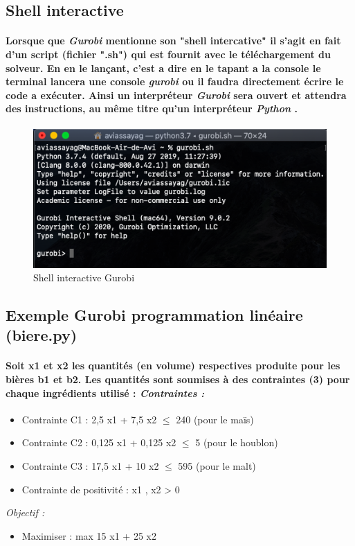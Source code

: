 \documentclass[a4paper, 12pt, twoside]{article}
\begin{document}
\subsection{Shell interactive }
\paragraph{Lorsque que \textit{Gurobi} mentionne son "shell intercative" il s'agit en fait d'un script (fichier ".sh") qui est fournit avec le téléchargement du solveur. En en le lançant, c'est a dire en le tapant a la console le terminal lancera une console \textit{gurobi} ou il faudra directement écrire le code a exécuter. Ainsi un interpréteur \textit{Gurobi} sera ouvert et attendra des instructions, au même titre qu'un interpréteur \textit{Python} .}
\begin{center}
\begin{figure}[h!]
\centering
\includegraphics[scale=0.8]{console.png}
\caption{Shell interactive Gurobi }
\end{figure}
\end{center}

\subsection{Exemple Gurobi programmation linéaire (biere.py)}
\paragraph{Soit x1 et x2 les quantités (en volume) respectives produite pour les bières b1 et b2. Les quantités sont soumises à des contraintes (3) pour chaque ingrédients utilisé : \newline \textit{Contraintes : }}
\begin{itemize} 
\item   Contrainte C1 : 2,5 x1 + 7,5 x2  $\leq$ 240 (pour le maïs)
\item   Contrainte C2 : 0,125 x1 + 0,125 x2 $\leq$ 5 (pour le houblon)
\item   Contrainte C3 : 17,5 x1 + 10 x2  $\leq$ 595 (pour le malt)
\item  Contrainte  de positivité : x1 , x2 > 0
\end{itemize}
\textit{Objectif : }
\begin{itemize} 
\item Maximiser : max 15 x1 + 25 x2
\end{itemize}
\end{document}
